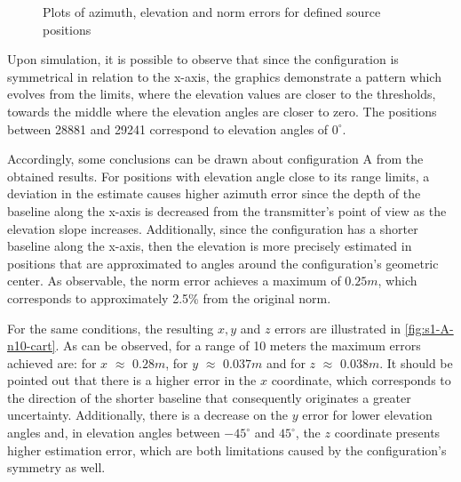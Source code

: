 \begin{figure}[!htbp]
	\captionsetup{justification=centering,margin=2cm}
	\caption{Plots of azimuth, elevation and norm errors for defined source positions}
	\label{fig:s1-A-n10-sph}
\end{figure}

Upon simulation, it is possible to observe that since the configuration is symmetrical in relation to the x-axis, the graphics demonstrate a pattern which evolves from the limits, where the elevation values are closer to the thresholds, towards the middle where the elevation angles are closer to zero. The positions between 28881 and 29241 correspond to elevation angles of $0^\circ$.

Accordingly, some conclusions can be drawn about configuration A from the obtained results. For positions with elevation angle close to its range limits, a deviation in the estimate causes higher azimuth error since the depth of the baseline along the x-axis is decreased from the transmitter's point of view as the elevation slope increases. Additionally, since the configuration has a shorter baseline along the x-axis, then the elevation is more precisely estimated in positions that are approximated to angles around the configuration's geometric center. As observable, the norm error achieves a maximum of $0.25m$, which corresponds to approximately 2.5\% from the original norm. 

For the same conditions, the resulting $x, y$ and $z$ errors are illustrated in \ref{fig:s1-A-n10-cart}. As can be observed, for a range of 10 meters the maximum errors achieved are: for $x$ $\approx$ $0.28m$, for $y$ $\approx$ $0.037m$ and for $z$ $\approx$ $0.038m$. It should be pointed out that there is a higher error in the $x$ coordinate, which corresponds to the direction of the shorter baseline that consequently originates a greater uncertainty. Additionally, there is a decrease on the $y$ error for lower elevation angles and, in elevation angles between $-45^{\circ}$ and $45^{\circ}$, the $z$ coordinate presents higher estimation error, which are both limitations caused by the configuration's symmetry as well.

